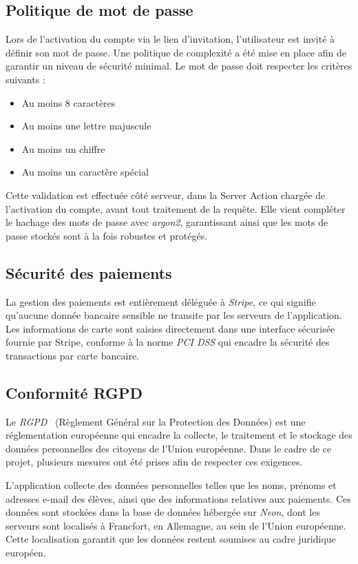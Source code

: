 \documentclass{article}
\begin{document}
\subsection{Politique de mot de passe}
Lors de l'activation du compte via le lien d'invitation, l'utilisateur 
est invité à définir son mot de passe. Une politique de complexité a été 
mise en place afin de garantir un niveau de sécurité minimal. Le mot de 
passe doit respecter les critères suivants :
\begin{itemize}
    \item Au moins 8 caractères
    \item Au moins une lettre majuscule
    \item Au moins un chiffre
    \item Au moins un caractère spécial
\end{itemize}
Cette validation est effectuée côté serveur, dans la Server Action 
chargée de l'activation du compte, avant tout traitement de la requête. 
Elle vient compléter le hachage des mots de passe avec \textit{argon2}, 
garantissant ainsi que les mots de passe stockés sont à la fois 
robustes et protégés.

\subsection{Sécurité des paiements}

La gestion des paiements est entièrement déléguée à \textit{Stripe}, 
ce qui signifie qu'aucune donnée bancaire sensible ne transite par 
les serveurs de l'application. Les informations de carte sont saisies 
directement dans une interface sécurisée fournie par Stripe, conforme 
à la norme \textit{PCI DSS} qui encadre la sécurité des transactions 
par carte bancaire.

\subsection{Conformité RGPD}

Le \textit{RGPD}~\cite{rgpd} (Règlement Général sur la Protection des Données) 
est une réglementation européenne qui encadre la collecte, le 
traitement et le stockage des données personnelles des citoyens 
de l'Union européenne. Dans le cadre de ce projet, plusieurs 
mesures ont été prises afin de respecter ces exigences.

L'application collecte des données personnelles telles que les 
noms, prénoms et adresses e-mail des élèves, ainsi que des 
informations relatives aux paiements. Ces données sont stockées 
dans la base de données hébergée sur \textit{Neon}, dont les 
serveurs sont localisés à Francfort, en Allemagne, au sein de 
l'Union européenne. Cette localisation garantit que les données 
restent soumises au cadre juridique européen.
\end{document}
